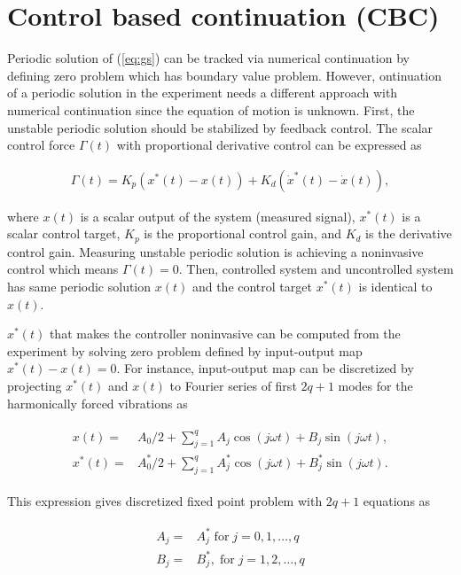 \documentclass[openacc]{rsproca_new}%
\newcommand{\Eref}[1]{(\ref{#1})}
\begin{document}
\section{Control based continuation (CBC)}\label{CBC}

Periodic solution of \Eref{eq:gs} can be tracked via numerical continuation by defining zero problem which has boundary value problem. However, ontinuation of a periodic solution in the experiment needs a different approach with numerical continuation since the equation of motion is unknown. First, the unstable periodic solution should be stabilized by feedback control. The scalar control force $\Gamma(t)$ with proportional derivative control can be expressed as

\begin{align}
  \Gamma(t)=K_p(x^*(t)-x(t))+K_d(\dot x^*(t)-\dot x(t)),
\end{align}

\noindent where $x(t)$ is a scalar output of the system (measured signal), $x^*(t)$ is a scalar control target, $K_p$ is the proportional control gain, and $K_d$ is the derivative control gain. Measuring unstable periodic solution is achieving a noninvasive control which means $\Gamma(t)=0$. Then, controlled system and uncontrolled system has same periodic solution $x(t)$ and the control target $x^*(t)$ is identical to $x(t)$.

$x^*(t)$ that makes the controller noninvasive can be computed from the experiment by solving zero problem defined by input-output map $x^*(t)-x(t)=0$. For instance, input-output map can be discretized by projecting $x^*(t)$ and $x(t)$ to Fourier series of first $2q+1$ modes for the harmonically forced vibrations as

\begin{align}\label{eq:dis}
  \begin{split}
  x(t)=&A_0/2+  \sum_{j=1}^{q} A_j \cos (j\omega t)+B_j \sin (j\omega t),\\
  x^*(t)=&A_0^*/2+  \sum_{j=1}^{q} A^*_j \cos (j\omega t)+B^*_j \sin (j\omega t).
\end{split}
\end{align}

\noindent This expression gives discretized fixed point problem with $2q+1$ equations as

\begin{align}\label{eq:zp}
  \begin{split}
  A_j=&A^*_j \; \textrm{for} \; j=0,1,\ldots,q\\
  B_j=&B^*_j,\; \textrm{for} \; j=1,2,\ldots,q
\end{split}
\end{align}
\end{document}
